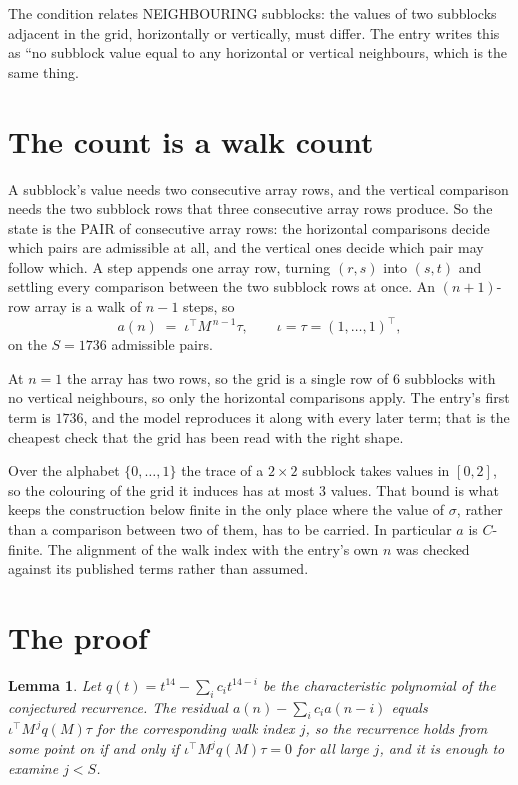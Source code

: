 \documentclass[11pt,a4paper]{article}
\theoremstyle{plain}
\newtheorem{lemma}[theorem]{Lemma}
\theoremstyle{definition}
\begin{document}
The condition relates NEIGHBOURING subblocks: the values of two subblocks adjacent in the grid,
horizontally or vertically, must differ. The entry writes this as ``no subblock value equal to any horizontal or vertical neighbours, which is the same thing.

\section{The count is a walk count}

A subblock's value needs two consecutive array rows, and the vertical
comparison needs the two subblock rows that three consecutive array rows produce. So the state
is the PAIR of consecutive array rows: the horizontal comparisons decide which pairs are
admissible at all, and the vertical ones decide which pair may follow which. A step appends one
array row, turning $(r,s)$ into $(s,t)$ and settling every comparison between the two subblock
rows at once. An $(n+1)$-row array is a walk of $n-1$ steps, so
\[
a(n)\;=\;\iota^{\!\top}M^{\,n-1}\tau,\qquad\iota=\tau=(1,\dots,1)^{\!\top},
\]
on the $S=1736$ admissible pairs.

At $n=1$ the array has two rows, so the grid is a single row of $6$
subblocks with no vertical neighbours, so only the horizontal comparisons apply. The
entry's first term is $1736$, and the model reproduces it along with every later term; that
is the cheapest check that the grid has been read with the right shape.

Over the alphabet $\{0,\dots,1\}$ the trace of a $2\times2$ subblock takes values in
$[0,2]$, so the colouring of the grid it induces has at most $3$ values.
That bound is what keeps the construction below finite in the only place where the value of
$\sigma$, rather than a comparison between two of them, has to be carried.
In particular $a$ is $C$-finite. The alignment of the walk index with the entry's own $n$ was
checked against its published terms rather than assumed.

\section{The proof}

\begin{lemma}\label{lem:crit}
Let $q(t)=t^{14}-\sum_i c_it^{14-i}$ be the characteristic polynomial of the
conjectured recurrence. The residual $a(n)-\sum_ic_ia(n-i)$ equals
$\iota^{\!\top}M^{\,j}q(M)\tau$ for the corresponding walk index $j$, so the recurrence
holds from some point on if and only if $\iota^{\!\top}M^{j}q(M)\tau=0$ for all large $j$,
and it is enough to examine $j<S$.
\end{lemma}
\end{document}
